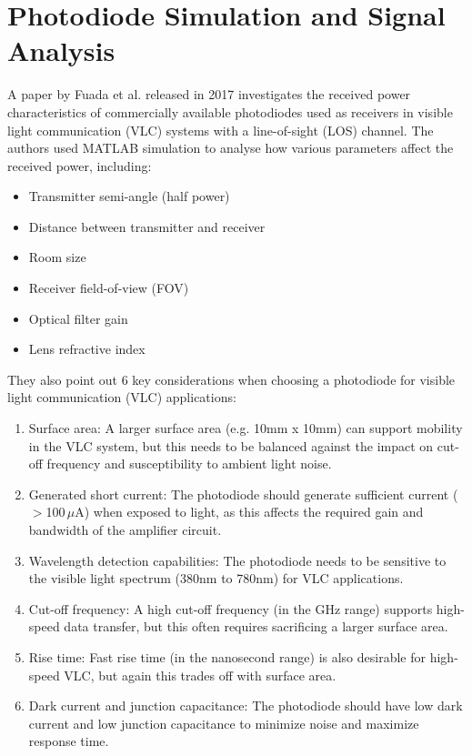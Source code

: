 \section{Photodiode Simulation and Signal Analysis}
A paper by Fuada et al. released in 2017 investigates the received power characteristics of commercially available photodiodes used as receivers in visible light communication (VLC) systems with a line-of-sight (LOS) channel. 
The authors used MATLAB simulation to analyse how various parameters affect the received power, including:
\begin{itemize}
\item Transmitter semi-angle (half power)
\item Distance between transmitter and receiver
\item Room size
\item Receiver field-of-view (FOV)
\item Optical filter gain
\item Lens refractive index
\end{itemize}

They also point out 6 key considerations when choosing a photodiode for visible light communication (VLC) applications:
\begin{enumerate}
\item Surface area: A larger surface area (e.g. 10mm x 10mm) can support mobility in the VLC system, but this needs to be balanced against the impact on cut-off frequency and susceptibility to ambient light noise.
\item Generated short current: The photodiode should generate sufficient current ($>$100\,$\mu$A) when exposed to light, as this affects the required gain and bandwidth of the amplifier circuit.

\item Wavelength detection capabilities: The photodiode needs to be sensitive to the visible light spectrum (380nm to 780nm) for VLC applications.

\item Cut-off frequency: A high cut-off frequency (in the GHz range) supports high-speed data transfer, but this often requires sacrificing a larger surface area.

\item Rise time: Fast rise time (in the nanosecond range) is also desirable for high-speed VLC, but again this trades off with surface area.

\item Dark current and junction capacitance: The photodiode should have low dark current and low junction capacitance to minimize noise and maximize response time.
\end{enumerate}

